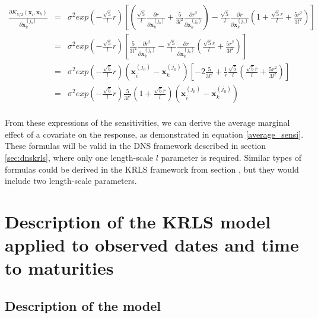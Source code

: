 \begin{itemize}
\begin{eqnarray*}
\frac{\partial K_{5/2}(\textbf{x}_i, \textbf{x}_k)}{\partial \textbf{x}_k^{(j_0)}} &=& \sigma^2 exp\left(-\frac{\sqrt{5}}{l}r\right) \left[ \left( \frac{\sqrt{5}}{l} \frac{\partial r}{\partial \textbf{x}_k^{(j_0)}} + \frac{5}{3 l^2} \frac{\partial r^2}{\partial \textbf{x}_k^{(j_0)}} \right)  - \frac{\sqrt{5}}{l} \frac{\partial r}{\partial \textbf{x}_k^{(j_0)}}\left( 1 + \frac{\sqrt{5}r}{l} + \frac{5 r^2}{3 l^2} \right)\right] \\
&=& \sigma^2 exp\left(-\frac{\sqrt{5}}{l}r\right) \left[ \frac{5}{3 l^2} \frac{\partial r^2}{\partial \textbf{x}_k^{(j_0)}}  - \frac{\sqrt{5}}{l} \frac{\partial r}{\partial \textbf{x}_k^{(j_0)}}\left(\frac{\sqrt{5}r}{l} + \frac{5 r^2}{3 l^2} \right)\right] \\
&=& \sigma^2 exp\left(-\frac{\sqrt{5}}{l}r\right) \left(\textbf{x}_i^{(j_0)} - \textbf{x}_k^{(j_0)} \right) \left[ -2\frac{5}{3 l^2} + \frac{1}{r}\frac{\sqrt{5}}{l} \left(\frac{\sqrt{5}r}{l} + \frac{5 r^2}{3 l^2} \right)\right] \\
&=& \sigma^2 exp\left(-\frac{\sqrt{5}}{l}r\right) \frac{5}{3l^2} \left( 1 + \frac{\sqrt{5} r}{l} \right)\left(\textbf{x}_i^{(j_0)} - \textbf{x}_k^{(j_0)} \right)\\
\end{eqnarray*}

\end{itemize}

From these expressions of the sensitivities, we can derive the average  marginal effect of a covariate on the response, as demonstrated in equation \ref{average_sensi}. These formulas will be valid in the DNS framework described in section \ref{sec:dnskrls}, where only one length-scale $l$ parameter is required. Similar types of formulas could be derived in the KRLS framework from section \label{sec:krls}, but they would include two length-scale parameters. 


\section{Description of the KRLS model applied to observed dates and time to maturities}
\label{sec:krls}

\subsection{Description of the model}

